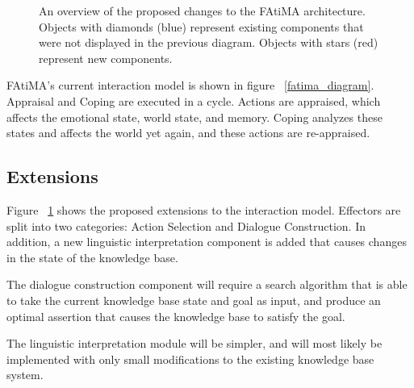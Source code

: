 \documentclass{article}
\begin{document}
\begin{figure}[h]
  \caption{An overview of the proposed changes to the FAtiMA architecture.  Objects with diamonds (blue)
  represent existing components that were not displayed in the previous diagram.  Objects with stars (red)
  represent new components.}
  \label{fatima_diagram_modifications}
\end{figure}

FAtiMA's current interaction model is shown in figure ~\ref{fatima_diagram}.
Appraisal and Coping are executed in a cycle.  Actions are appraised, which
affects the emotional state, world state, and memory.  Coping analyzes these
states and affects the world yet again, and these actions are re-appraised.

\subsection{Extensions}

Figure ~\ref{fatima_diagram_modifications} shows the proposed extensions
to the interaction model.  Effectors are split into two categories: Action
Selection and Dialogue Construction.  In addition, a new linguistic interpretation
component is added that causes changes in the state of the knowledge base.

The dialogue construction component will require a search algorithm that is
able to take the current knowledge base state and goal as input, and produce
an optimal assertion that causes the knowledge base to satisfy the goal.

The linguistic interpretation module will be simpler, and will most likely be
implemented with only small modifications to the existing knowledge base system.
\end{document}
